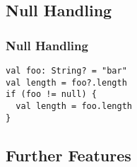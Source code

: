 

\subsection{Null Handling}
\begin{frame}[fragile]
	\frametitle{Null Handling}
\begin{lstlisting}
val foo: String? = "bar"
val length = foo?.length
if (foo != null) {
  val length = foo.length
}
\end{lstlisting}
\end{frame}


\subsection{Further Features}
